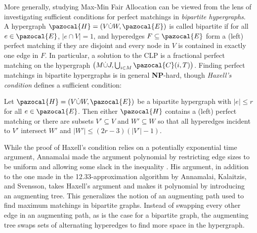 More generally, studying Max-Min Fair Allocation can be viewed from the lens of investigating sufficient conditions for 
perfect matchings in \emph{bipartite hypergraphs}. 
A hypergraph $\pazocal{H} = (V \dot\cup W, \pazocal{E})$ is called bipartite if for all
$e \in \pazocal{E}$, $|e \cap V|=1$, and hyperedges $F \subseteq \pazocal{E}$ form a (left) perfect matching 
if they are disjoint and every node in $V$ is contained in exactly one edge in $F$.
In particular, a solution to the CLP is a fractional perfect matching on the hypergraph 
$ \left(M \dot\cup J, \bigcup_{i \in M}\pazocal{C}(i,T) \right)$.  
Finding perfect matchings in bipartite hypergraphs is in general \textbf{NP}-hard, though
\emph{Haxell's condition} defines a sufficient condition:
\begin{theorem} \cite{HypergraphMatchingsHaxell95}
Let $\pazocal{H} = (V \dot\cup W, \pazocal{E})$ be a bipartite hypergraph with $|e| \leq r$ for all $e \in \pazocal{E}$.
Then either $\pazocal{H}$ contains a (left) perfect matching or there are subsets $V' \subseteq V$ and $W' \subseteq W$
so that all hyperedges incident to $V'$ intersect $W'$ and $|W'| \leq (2r-3)(|V'|-1)$.
\end{theorem}
While the proof of Haxell's condition relies on a potentially exponential time argument, 
Annamalai made the argument polynomial by restricting edge sizes to be uniform and allowing some slack in the inequality \cite{FindingPerfectMatchingsInHypergraphs-Annamalai-SODA16}.
His argument, in addition to the one made in the 12.33-approximation algorithm by Annamalai, Kalaitzis, and Svensson,
takes Haxell's argument and makes it polynomial by introducing an augmenting tree. 
This generalizes the notion of an augmenting path used to find maximum matchings in bipartite graphs.
Instead of swapping every other edge in an augmenting path, as is the case for a bipartite graph,
the augmenting tree swaps sets of alternating hyperedges to find more space in the hypergraph.









